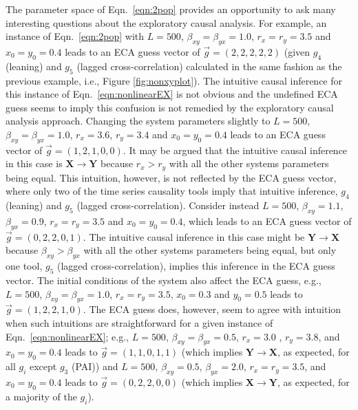\documentclass{article}[10pt]
\begin{document}
The parameter space of Eqn.\ \ref{eqn:2pop} provides an opportunity to ask many interesting questions about the exploratory causal analysis.  For example, an instance of Eqn.\ \ref{eqn:2pop} with $L=500$, $\beta_{xy} = \beta_{yx} = 1.0$, $r_x = r_y = 3.5$ and $x_0 = y_0 = 0.4$ leads to an ECA guess vector of $\vec{g}=(2,2,2,2,2)$ (given $g_4$ (leaning) and $g_5$ (lagged cross-correlation) calculated in the same fashion as the previous example, i.e., Figure \ref{fig:nonxyplot}).  The intuitive causal inference for this instance of Eqn.\ \ref{eqn:nonlinearEX} is not obvious and the undefined ECA guess seems to imply this confusion is not remedied by the exploratory causal analysis approach.  Changing the system parameters slightly to $L=500$, $\beta_{xy} = \beta_{yx} = 1.0$, $r_x = 3.6$, $r_y = 3.4$ and $x_0 = y_0 = 0.4$ leads to an ECA guess vector of $\vec{g}=(1,2,1,0,0)$.  It may be argued that the intuitive causal inference in this case is $\mathbf{X}\rightarrow\mathbf{Y}$ because $r_x>r_y$ with all the other systems parameters being equal.  This intuition, however, is not reflected by the ECA guess vector, where only two of the time series causality tools imply that intuitive inference, $g_4$ (leaning) and $g_5$ (lagged cross-correlation).  Consider instead $L=500$, $\beta_{xy} = 1.1$, $\beta_{yx} = 0.9$, $r_x = r_y = 3.5$ and $x_0 = y_0 = 0.4$, which leads to an ECA guess vector of $\vec{g}=(0,2,2,0,1)$.  The intuitive causal inference in this case might be $\mathbf{Y}\rightarrow\mathbf{X}$ because $\beta_{xy}>\beta_{yx}$ with all the other systems parameters being equal, but only one tool, $g_5$ (lagged cross-correlation), implies this inference in the ECA guess vector.  The initial conditions of the system also affect the ECA guess, e.g., $L=500$, $\beta_{xy} = \beta_{yx} = 1.0$, $r_x = r_y = 3.5$, $x_0 = 0.3$ and $y_0 = 0.5$ leads to $\vec{g}=(1,2,2,1,0)$.  The ECA guess does, however, seem to agree with intuition when such intuitions are straightforward for a given instance of Eqn.\ \ref{eqn:nonlinearEX}; e.g., $L=500$, $\beta_{xy} = \beta_{yx} = 0.5$, $r_x = 3.0$ , $r_y = 3.8$, and $x_0 = y_0 = 0.4$ leads to $\vec{g}=(1,1,0,1,1)$ (which implies $\mathbf{Y}\rightarrow\mathbf{X}$, as expected, for all $g_i$ except $g_3$ (PAI)) and $L=500$, $\beta_{xy} = 0.5$, $\beta_{yx} = 2.0$, $r_x = r_y = 3.5$, and $x_0 = y_0 = 0.4$ leads to $\vec{g}=(0,2,2,0,0)$ (which implies $\mathbf{X}\rightarrow\mathbf{Y}$, as expected, for a majority of the $g_i$).
\end{document}
